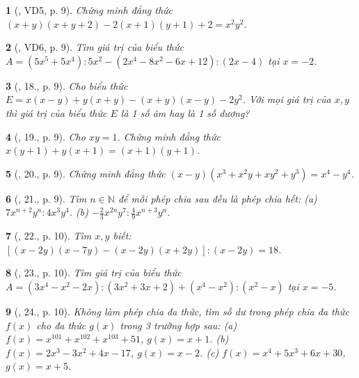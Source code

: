 \documentclass{article}
\newtheorem{baitoan}{}
\begin{document}
\begin{baitoan}[\cite{Tuyen_Toan_8}, VD5, p. 9]
	Chứng minh đẳng thức $(x + y)(x + y + 2) - 2(x + 1)(y + 1) + 2 = x^2y^2$.
\end{baitoan}

\begin{baitoan}[\cite{Tuyen_Toan_8}, VD6, p. 9]
	Tìm giá trị của biểu thức $A = (5x^5 + 5x^4):5x^2 - (2x^4 - 8x^2 - 6x + 12):(2x - 4)$ tại $x = -2$.
\end{baitoan}

\begin{baitoan}[\cite{Tuyen_Toan_8}, 18., p. 9]
	Cho biểu thức $E = x(x - y) + y(x + y) - (x + y)(x - y) - 2y^2$. Với mọi giá trị của $x,y$ thì giá trị của biểu thức $E$ là 1 số âm hay là 1 số dương?
\end{baitoan}

\begin{baitoan}[\cite{Tuyen_Toan_8}, 19., p. 9]
	Cho $xy = 1$. Chứng minh đẳng thức $x(y + 1) + y(x + 1) = (x + 1)(y + 1)$.
\end{baitoan}

\begin{baitoan}[\cite{Tuyen_Toan_8}, 20., p. 9]
	Chứng minh đẳng thức $(x - y)(x^3 + x^2y + xy^2 + y^3) = x^4 - y^4$.
\end{baitoan}

\begin{baitoan}[\cite{Tuyen_Toan_8}, 21., p. 9]
	Tìm $n\in\mathbb{N}$ để mỗi phép chia sau đều là phép chia hết: (a) $7x^{n+2}y^n:4x^3y^4$. (b) $-\frac{2}{3}x^{2n}y^7:\frac{4}{9}x^{n+3}y^n$.
\end{baitoan}

\begin{baitoan}[\cite{Tuyen_Toan_8}, 22., p. 10]
	Tìm $x,y$ biết: $[(x - 2y)(x - 7y) - (x - 2y)(x + 2y)]:(x - 2y) = 18$.
\end{baitoan}

\begin{baitoan}[\cite{Tuyen_Toan_8}, 23., p. 10]
	Tìm giá trị của biểu thức $A = (3x^4 - x^2 - 2x):(3x^2 + 3x + 2) + (x^4 - x^2):(x^2 - x)$ tại $x = -5$.
\end{baitoan}

\begin{baitoan}[\cite{Tuyen_Toan_8}, 24., p. 10]
	Không làm phép chia đa thức, tìm số dư trong phép chia đa thức $f(x)$ cho đa thức $g(x)$ trong 3 trường hợp sau: (a) $f(x) = x^{101} + x^{102} + x^{103} + 51$, $g(x) = x + 1$. (b) $f(x) = 2x^3 - 3x^2 + 4x - 17$, $g(x) = x - 2$. (c) $f(x) = x^4 + 5x^3 + 6x + 30$, $g(x) = x + 5$.
\end{baitoan}
\end{document}

